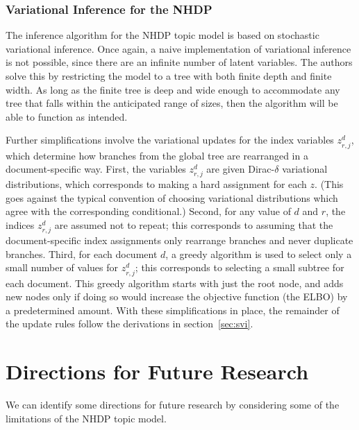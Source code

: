 \documentclass{article}
\begin{document}
\subsubsection{Variational Inference for the NHDP}

The inference algorithm for the NHDP topic model is based on stochastic variational inference.
Once again, a naive implementation of variational inference is not possible, since there are an infinite number of latent variables.
The authors solve this by restricting the model to a tree with both finite depth and finite width.
As long as the finite tree is deep and wide enough to accommodate any tree that falls within the anticipated range of sizes, then the algorithm will be able to function as intended.

Further simplifications involve the variational updates for the index variables $z^d_{r,j}$, which determine how branches from the global tree are rearranged in a document-specific way.
First, the variables $z^d_{r,j}$ are given Dirac-$\delta$ variational distributions, which corresponds to making a hard assignment for each $z$.
(This goes against the typical convention of choosing variational distributions which agree with the corresponding conditional.)
Second, for any value of $d$ and $r$, the indices $z^d_{r,j}$ are assumed not to repeat; this corresponds to assuming that the document-specific index assignments only rearrange branches and never duplicate branches.
Third, for each document $d$, a greedy algorithm is used to select only a small number of values for $z^d_{r,j}$; this corresponds to selecting a small subtree for each document.
This greedy algorithm starts with just the root node, and adds new nodes only if doing so would increase the objective function (the ELBO) by a predetermined amount.
With these simplifications in place, the remainder of the update rules follow the derivations in section~\ref{sec:svi}.

\section{Directions for Future Research}

We can identify some directions for future research by considering some of the limitations of the NHDP topic model.
\end{document}
